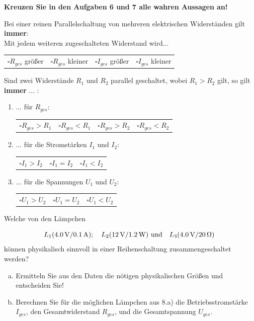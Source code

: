 \documentclass[a4paper]{article}
\begin{document}
\begin{enumerate}[1.]
{\bf Kreuzen Sie in den Aufgaben 6 und 7 alle wahren Aussagen an!}

\item Bei einer reinen Parallelschaltung von mehreren elektrischen Widerständen gilt
 {\bf immer}:\\
Mit jedem weiteren zugeschalteten Widerstand wird$\dots$\\

\begin{tabular}{p{75 pt}p{75 pt}p{75 pt}p{75 pt}}
$\square R_{ges}$ größer& $\square R_{ges}$ kleiner&
 $\square I_{ges}$ größer&$\square I_{ges}$ kleiner
\end{tabular}

\item Sind zwei Widerstände $R_1$ und $R_2$ parallel geschaltet, wobei $R_1>R_2$ gilt, so gilt {\bf immer} $\dots$ :
\begin{enumerate}
\item $\dots$ für $R_{ges}$:

\begin{tabular}{p{75 pt}p{75 pt}p{75 pt}p{75 pt}}
  $\square R_{ges}>R_1 $&$ \square R_{ges}<R_1 $&$
 \square R_{ges}>R_2 $&$ \square R_{ges}<R_2 $
\end{tabular}

\item $\dots$  für die Stromstärken $I_1$ und $I_2$:

\begin{tabular}{p{100 pt}p{100 pt}p{100 pt}}
  $\square I_1>I_2 $ & $ \square I_1=I_2 $ & $ \square I_1 <I_2 $
\end{tabular}

\item $\dots$  für die Spannungen  $U_1$ und $U_2$:

\begin{tabular}{p{100 pt}p{100 pt}p{100 pt}}
  $\square U_1>U_2 $ & $ \square U_1=U_2 $ & $ \square U_1 <U_2 $
\end{tabular}
\end{enumerate}

{\bf \item Welche von den Lämpchen }
$$L_1 ( \SI{4,0}{\volt} / \SI{0,1}{\ampere}); \quad L_2 (\SI{12}{\volt} / \SI{1,2}{\watt})
 ~\textnormal{und} \quad L_3 (\SI{4,0}{\volt} / \SI{20}{\ohm})$$
 können physikalisch sinnvoll in einer Reihenschaltung zusammengeschaltet werden?
\begin{enumerate}[a)]
\item Ermitteln Sie aus den Daten die nötigen physikalischen Größen und entscheiden Sie!
\item Berechnen Sie für die möglichen Lämpchen aus 8.a) die Betriebsstromstärke $I_{ges}$, den Gesamtwiderstand $R_{ges}$, und die Gesamtspannung $U_{ges}$. 
\end{enumerate}


\end{enumerate}
\end{document}
